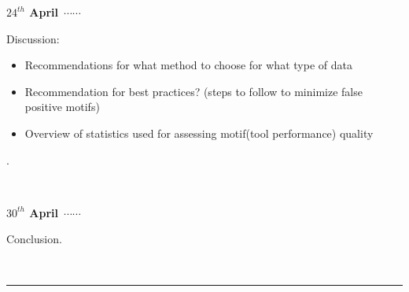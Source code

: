 \documentclass[a4paper,11pt]{article}
\newcommand\ytl[2]{
\parbox[b]{8em}{\hfill{\color{cyan}\bfseries\sffamily #1}~$\cdots\cdots$~}\makebox[0pt][c]{$\bullet$}\vrule\quad \parbox[c]{4.5cm}{\vspace{7pt}\color{red!40!black!80}\raggedright\sffamily #2.\\[7pt]}\\[-3pt]}
\begin{document}
\begin{table}
\centering
\footnotesize
\begin{minipage}[t]{.7\linewidth}
\ytl{$24^{th}$ April}{Discussion: \begin{itemize}
\item Recommendations for what method to choose for what type of data
\item Recommendation for best practices? (steps to follow to minimize false positive motifs)
\item Overview of statistics used for assessing motif(tool performance) quality
\end{itemize}}
\bigskip
\ytl{$30^{th}$ April}{Conclusion}
\rule{\linewidth}{1pt}%
\end{minipage}%
\end{table}



\end{document}
